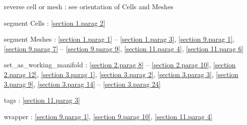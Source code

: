 \documentclass[a4paper]{scrreprt}
\def\numb{}
\newcommand\verm[1]{\textcolor{manif}{#1}}
\renewcommand\tt{\normalfont\ttfamily}
\begin{document}
\noindent
reverse cell or mesh : see orientation of {\small\tt \verm{Cell}}s and {\small\tt \verm{Mesh}}es

\noindent
segment {\small\tt \verm{Cell}}s : \ref{\numb section 1.\numb parag 2}

\noindent
segment {\small\tt \verm{Mesh}}es :
\ref{\numb section 1.\numb parag 1} -- \ref{\numb section 1.\numb parag 3},
\ref{\numb section 9.\numb parag 1}, \ref{\numb section 9.\numb parag 7} --
\ref{\numb section 9.\numb parag 9}, \ref{\numb section 11.\numb parag 4},
\ref{\numb section 11.\numb parag 6}

\noindent
{\small\tt set\_as\_working\_manifold} :
\ref{\numb section 2.\numb parag 8} -- \ref{\numb section 2.\numb parag 10},
\ref{\numb section 2.\numb parag 12}, \ref{\numb section 3.\numb parag 1},
\ref{\numb section 3.\numb parag 2}, \ref{\numb section 3.\numb parag 3},
\ref{\numb section 3.\numb parag 9},
\ref{\numb section 3.\numb parag 14} -- \ref{\numb section 3.\numb parag 24}

\noindent
{\small\tt\verm{tag}}s : \ref{\numb section 11.\numb parag 3}

\noindent
wrapper : \ref{\numb section 9.\numb parag 1}, \ref{\numb section 9.\numb parag 10},
\ref{\numb section 11.\numb parag 4}
\end{document}
